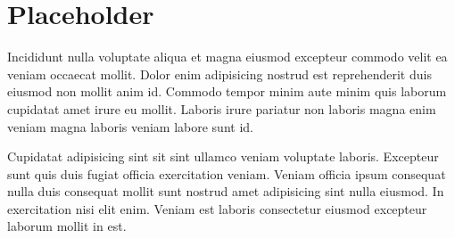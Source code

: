 \section{Placeholder}

Incididunt nulla voluptate aliqua et magna eiusmod excepteur commodo velit ea veniam occaecat mollit. Dolor enim adipisicing nostrud est reprehenderit duis eiusmod non mollit anim id. Commodo tempor minim aute minim quis laborum cupidatat amet irure eu mollit. Laboris irure pariatur non laboris magna enim veniam magna laboris veniam labore sunt id.

Cupidatat adipisicing sint sit sint ullamco veniam voluptate laboris. Excepteur sunt quis duis fugiat officia exercitation veniam. Veniam officia ipsum consequat nulla duis consequat mollit sunt nostrud amet adipisicing sint nulla eiusmod. In exercitation nisi elit enim. Veniam est laboris consectetur eiusmod excepteur laborum mollit in est.
